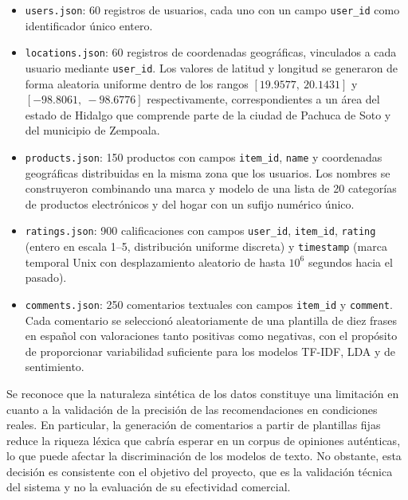 \documentclass[11pt, letterpaper]{article}
\begin{document}
	\begin{itemize}
		\item \texttt{users.json}: 60 registros de usuarios, cada uno con un
		campo \texttt{user\_id} como identificador único entero.
		
		\item \texttt{locations.json}: 60 registros de coordenadas geográficas,
		vinculados a cada usuario mediante \texttt{user\_id}. Los valores de
		latitud y longitud se generaron de forma aleatoria uniforme dentro de
		los rangos $[19.9577,\ 20.1431]$ y $[-98.8061,\ -98.6776]$ respectivamente,
		correspondientes a un área del estado de Hidalgo que comprende parte de
		la ciudad de Pachuca de Soto y del municipio de Zempoala.
		
		\item \texttt{products.json}: 150 productos con campos \texttt{item\_id},
		\texttt{name} y coordenadas geográficas distribuidas en la misma zona
		que los usuarios. Los nombres se construyeron combinando una marca y
		modelo de una lista de 20 categorías de productos electrónicos y del
		hogar con un sufijo numérico único.
		
		\item \texttt{ratings.json}: 900 calificaciones con campos
		\texttt{user\_id}, \texttt{item\_id}, \texttt{rating} (entero en escala
		1--5, distribución uniforme discreta) y \texttt{timestamp} (marca
		temporal Unix con desplazamiento aleatorio de hasta $10^6$ segundos
		hacia el pasado).
		
		\item \texttt{comments.json}: 250 comentarios textuales con campos
		\texttt{item\_id} y \texttt{comment}. Cada comentario se seleccionó
		aleatoriamente de una plantilla de diez frases en español con
		valoraciones tanto positivas como negativas, con el propósito de
		proporcionar variabilidad suficiente para los modelos TF-IDF, LDA y
		de sentimiento.
	\end{itemize}
	
	Se reconoce que la naturaleza sintética de los datos constituye una
	limitación en cuanto a la validación de la precisión de las recomendaciones
	en condiciones reales. En particular, la generación de comentarios a partir
	de plantillas fijas reduce la riqueza léxica que cabría esperar en un corpus
	de opiniones auténticas, lo que puede afectar la discriminación de los
	modelos de texto. No obstante, esta decisión es consistente con el objetivo
	del proyecto, que es la validación técnica del sistema y no la evaluación
	de su efectividad comercial.
	
\end{document}
